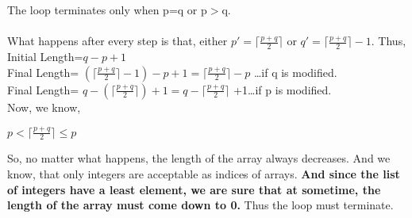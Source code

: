 \documentclass{article}
\begin{document}
The loop terminates only when p=q or p$>$q.
\\
\\
 What happens after every step is that, either $p'=\lceil \frac{p+q}{2} \rceil$ or $q'=\lceil \frac{p+q}{2} \rceil -1$. Thus,
\\
Initial Length=$q-p+1$\\
Final Length= $(\lceil \frac{p+q}{2} \rceil -1)-p+1= \lceil \frac{p+q}{2} \rceil-p$ \ldots if q is modified.
\\
Final Length= $q-(\lceil \frac{p+q}{2} \rceil)+1= q-\lceil \frac{p+q}{2} \rceil$ +1\ldots if p is modified.
\\
Now, we know,
\begin{center}
     $p<\lceil \frac{p+q}{2} \rceil \leq p$
\end{center}
So, no matter what happens, the length of the array always decreases. And we know, that only integers are acceptable as indices of arrays. \textbf{And since the list of integers have a least element, we are sure that at sometime, the length of the array must come down to 0.}
Thus the loop must terminate.
\end{document}
